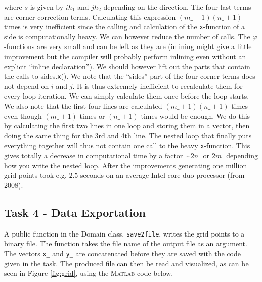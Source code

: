 \documentclass[paper=a4, fontsize=12pt]{article} %
\begin{document}
where $s$ is given by $ih_1$ and $jh_2$ depending on the direction. The four last terms are corner correction terms. Calculating this expression $(m\_+1)(n\_+1)$ times is very inefficient since the calling and calculation of the \texttt{x}-function of a side is computationally heavy. We can however reduce the number of calls. The $\varphi$-functions are very small and can be left as they are (inlining might give a little improvement but the compiler will probably perform inlining even without an explicit ``inline declaration''). We should however lift out the parts that contain the calls to sides.\texttt{x}(). We note that the ``sides'' part of the four corner terms does not depend on $i$ and $j$. It is thus extremely inefficient to recalculate them for every loop iteration. We can simply calculate them once before the loop starts. We also note that the first four lines are calculated $(m\_+1)(n\_+1)$ times even though $(m\_+1)$ times or $(n\_+1)$ times would be enough. We do this by calculating the first two lines in one loop and storing them in a vector, then doing the same thing for the 3rd and 4th line. The nested loop that finally puts everything together will thus not contain one call to the heavy \texttt{x}-function. This gives totally a decrease in computational time by a factor $\sim 2n\_ $ or $2m\_ $ depending how you write the nested loop. After the improvements generating one million grid points took e.g. $2.5$ seconds on an average Intel core duo processor (from 2008).  \\

\subsection*{Task 4 - Data Exportation}

A public function in the Domain class, \texttt{save2file}, writes the grid points to a binary file. The function takes the file name of the output file as an argument. The vectors \texttt{x\_} and \texttt{y\_} are concatenated before they are saved with the code given in the task. The produced file can then be read and visualized, as can be seen in Figure \ref{fig:grid}, using the \textsc{Matlab} code below.
\end{document}

